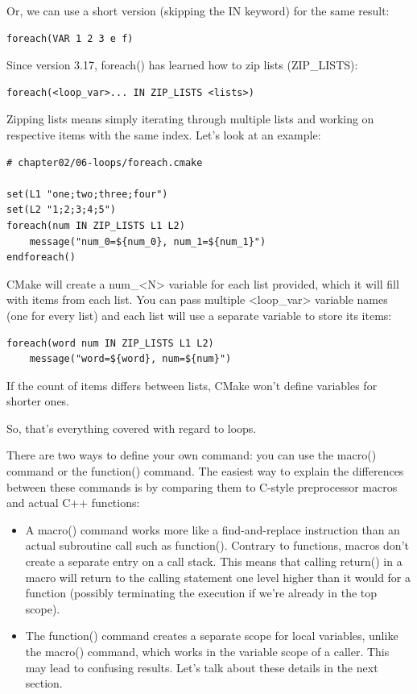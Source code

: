 Or, we can use a short version (skipping the IN keyword) for the same result:

\begin{lstlisting}[style=styleCMake]
foreach(VAR 1 2 3 e f)
\end{lstlisting}

Since version 3.17, foreach() has learned how to zip lists (ZIP\_LISTS):

\begin{lstlisting}[style=styleCMake]
foreach(<loop_var>... IN ZIP_LISTS <lists>)
\end{lstlisting}

Zipping lists means simply iterating through multiple lists and working on respective items with the same index. Let's look at an example:

\begin{lstlisting}[style=styleCMake]
# chapter02/06-loops/foreach.cmake

set(L1 "one;two;three;four")
set(L2 "1;2;3;4;5")
foreach(num IN ZIP_LISTS L1 L2)
	message("num_0=${num_0}, num_1=${num_1}")
endforeach()
\end{lstlisting}

CMake will create a num\_<N> variable for each list provided, which it will fill with items from each list. You can pass multiple <loop\_var> variable names (one for every list) and each list will use a separate variable to store its items:

\begin{lstlisting}[style=styleCMake]
foreach(word num IN ZIP_LISTS L1 L2)
	message("word=${word}, num=${num}")
\end{lstlisting}

If the count of items differs between lists, CMake won't define variables for shorter ones.

So, that's everything covered with regard to loops.


There are two ways to define your own command: you can use the macro() command or the function() command. The easiest way to explain the differences between these commands is by comparing them to C-style preprocessor macros and actual C++ functions:

\begin{itemize}
\item 
A macro() command works more like a find-and-replace instruction than an actual subroutine call such as function(). Contrary to functions, macros don't create a separate entry on a call stack. This means that calling return() in a macro will return to the calling statement one level higher than it would for a function (possibly terminating the execution if we're already in the top scope).

\item 
The function() command creates a separate scope for local variables, unlike the macro() command, which works in the variable scope of a caller. This may lead to confusing results. Let's talk about these details in the next section.
\end{itemize}

